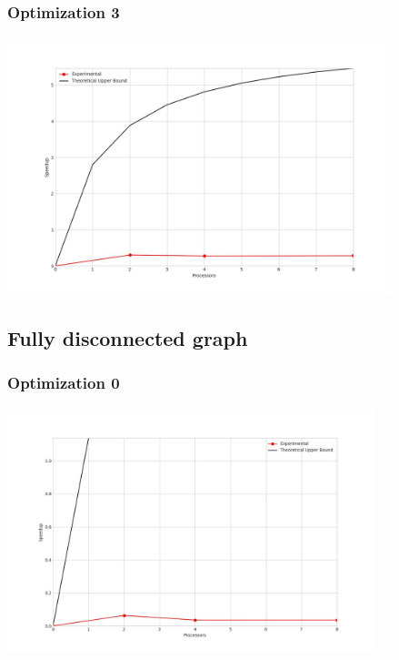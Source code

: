 \subsubsection{Optimization 3}
\begin{center}
    \resizebox{0.95\textwidth}{!}{}
    \includegraphics[width=0.84\textwidth]{../img/speedup-graph_type-fully-connected-12500-O3}
\end{center}

\clearpage
\subsection{Fully disconnected graph}
\subsubsection{Optimization 0}
\begin{center}
    \resizebox{0.95\textwidth}{!}{}
    \includegraphics[width=0.8\textwidth]{../img/speedup-graph_type-fully-disconnected-1000000-O0}
\end{center}

